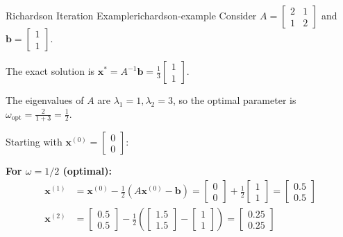 \begin{example}{Richardson Iteration Example}{richardson-example}
    Consider $A = \begin{bmatrix} 2 & 1 \\ 1 & 2 \end{bmatrix}$ and $\mathbf{b} = \begin{bmatrix} 1 \\ 1 \end{bmatrix}$.

    The exact solution is $\mathbf{x}^* = A^{-1}\mathbf{b} = \frac{1}{3}\begin{bmatrix} 1 \\ 1 \end{bmatrix}$.

    The eigenvalues of $A$ are $\lambda_1 = 1, \lambda_2 = 3$, so the optimal parameter is
    $\omega_{\text{opt}} = \frac{2}{1+3} = \frac{1}{2}$.

    Starting with $\mathbf{x}^{(0)} = \begin{bmatrix} 0 \\ 0 \end{bmatrix}$:

    \textbf{For $\omega = 1/2$ (optimal):}
    \begin{align*}
        \mathbf{x}^{(1)} &= \mathbf{x}^{(0)} - \frac{1}{2}(A\mathbf{x}^{(0)} - \mathbf{b}) = \begin{bmatrix} 0 \\ 0 \end{bmatrix} + \frac{1}{2}\begin{bmatrix} 1 \\ 1 \end{bmatrix} = \begin{bmatrix} 0.5 \\ 0.5 \end{bmatrix} \\
        \mathbf{x}^{(2)} &= \begin{bmatrix} 0.5 \\ 0.5 \end{bmatrix} - \frac{1}{2}\left(\begin{bmatrix} 1.5 \\ 1.5 \end{bmatrix} - \begin{bmatrix} 1 \\ 1 \end{bmatrix}\right) = \begin{bmatrix} 0.25 \\ 0.25 \end{bmatrix}
    \end{align*}


\end{example}
